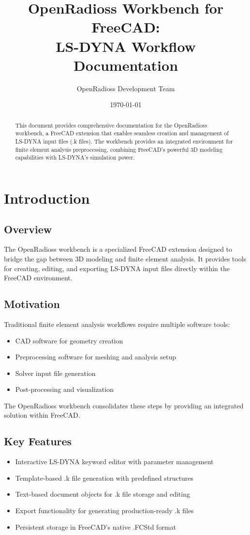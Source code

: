 \documentclass[12pt,a4paper]{article}
\title{OpenRadioss Workbench for FreeCAD: \\ LS-DYNA Workflow Documentation}
\author{OpenRadioss Development Team}
\date{\today}
\begin{document}
\maketitle

\begin{abstract}
This document provides comprehensive documentation for the OpenRadioss workbench, a FreeCAD extension that enables seamless creation and management of LS-DYNA input files (.k files). The workbench provides an integrated environment for finite element analysis preprocessing, combining FreeCAD's powerful 3D modeling capabilities with LS-DYNA's simulation power.
\end{abstract}

\tableofcontents

\newpage

\section{Introduction}

\subsection{Overview}
The OpenRadioss workbench is a specialized FreeCAD extension designed to bridge the gap between 3D modeling and finite element analysis. It provides tools for creating, editing, and exporting LS-DYNA input files directly within the FreeCAD environment.

\subsection{Motivation}
Traditional finite element analysis workflows require multiple software tools:
\begin{itemize}
    \item CAD software for geometry creation
    \item Preprocessing software for meshing and analysis setup
    \item Solver input file generation
    \item Post-processing and visualization
\end{itemize}

The OpenRadioss workbench consolidates these steps by providing an integrated solution within FreeCAD.

\subsection{Key Features}
\begin{itemize}
    \item Interactive LS-DYNA keyword editor with parameter management
    \item Template-based .k file generation with predefined structures
    \item Text-based document objects for .k file storage and editing
    \item Export functionality for generating production-ready .k files
    \item Persistent storage in FreeCAD's native .FCStd format
\end{itemize}
\end{document}
